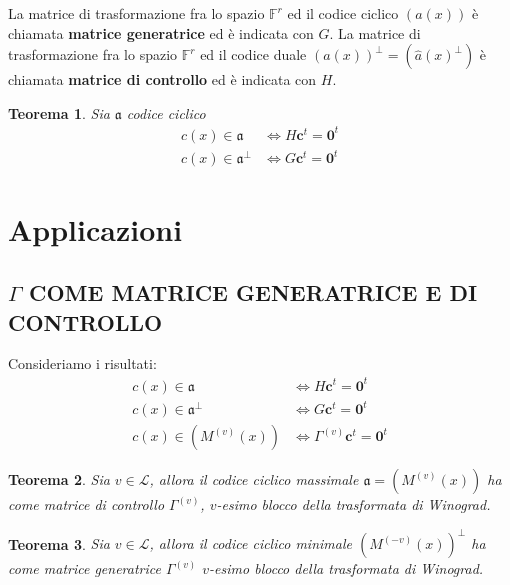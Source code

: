 \documentclass[mathserif]{beamer}
\newtheorem{teorema}{Teorema}
\begin{document}

\begin{frame}
  La matrice di trasformazione fra lo spazio $\mathbb{F}^{r}$ ed il codice ciclico $(a(x))$ è chiamata {\bf matrice generatrice} ed è indicata con $G$.
  La matrice di trasformazione fra lo spazio $\mathbb{F}^{r}$ ed il codice duale $(a(x))^{\perp} = (\hat{a}(x)^{\perp})$ è chiamata {\bf matrice di controllo} ed è indicata con $H$.
  \begin{teorema}
     Sia $\mathfrak{a} $ codice ciclico
     \begin{align*}
	c(x) \in \mathfrak{a} &\iff H \mathbf{c}^{t} = \mathbf{0}^{t}  \\
	c(x) \in \mathfrak{a}^{\perp} &\iff G \mathbf{c}^{t} = \mathbf{0}^{t}
      \end{align*}
  \end{teorema}
\end{frame}


\section{Applicazioni}
\subsection{$\Gamma$ COME MATRICE GENERATRICE E DI CONTROLLO}
\begin{frame}
  Consideriamo i risultati:
      \begin{align*}
      c(x) \in \mathfrak{a} &\iff H \mathbf{c}^{t} = \mathbf{0}^{t}  \\
      c(x) \in \mathfrak{a}^{\perp} &\iff G \mathbf{c}^{t} = \mathbf{0}^{t} \\
      c(x) \in (M^{(v)}(x)) &\iff \Gamma^{(v)} \mathbf{c}^{t} = \mathbf{0}^{t}
    \end{align*}
   \begin{teorema}
      Sia $v \in \mathscr{L}$, allora il codice ciclico massimale $\mathfrak{a} = (M^{(v)}(x))$ ha come matrice di controllo $\Gamma^{(v)} $, $v$-esimo blocco della trasformata di Winograd.
    \end{teorema}
    \begin{teorema}
      Sia $v \in \mathscr{L}$, allora il codice ciclico minimale $(M^{(-v)}(x))^{\perp}$ ha come matrice generatrice $\Gamma^{(v)} $ $v$-esimo blocco della trasformata di Winograd.
    \end{teorema}
\end{frame}
\end{document}
